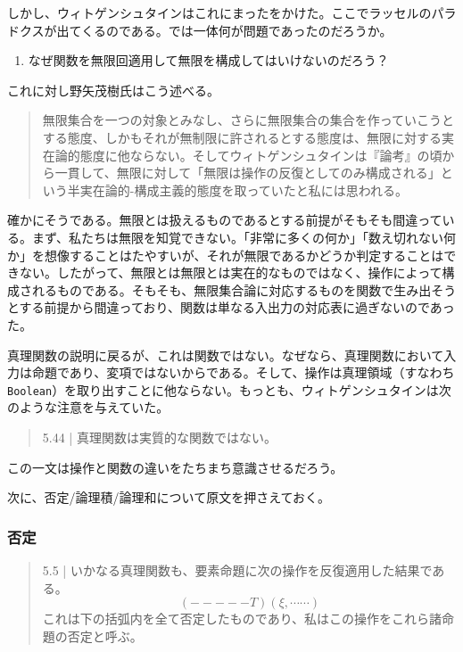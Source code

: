 \documentclass[a4paper,onecolumn,article]{jarticle}
\newcounter{ct}               %
\begin{document}
しかし、ウィトゲンシュタインはこれにまったをかけた。ここでラッセルのパラドクスが出てくるのである。では一体何が問題であったのだろうか。

\begin{enumerate}
  \item なぜ関数を無限回適用して無限を構成してはいけないのだろう？
\end{enumerate}
これに対し野矢茂樹氏はこう述べる。

\begin{quotation}
   無限集合を一つの対象とみなし、さらに無限集合の集合を作っていこうとする態度、しかもそれが無制限に許されるとする態度は、無限に対する実在論的態度に他ならない。そしてウィトゲンシュタインは『論考』の頃から一貫して、無限に対して「無限は操作の反復としてのみ構成される」という半実在論的-構成主義的態度を取っていたと私には思われる。
\end{quotation}

確かにそうである。無限とは扱えるものであるとする前提がそもそも間違っている。まず、私たちは無限を知覚できない。「非常に多くの何か」「数え切れない何か」を想像することはたやすいが、それが無限であるかどうか判定することはできない。したがって、無限とは無限とは実在的なものではなく、操作によって構成されるものである。そもそも、無限集合論に対応するものを関数で生み出そうとする前提から間違っており、関数は単なる入出力の対応表に過ぎないのであった。

真理関数の説明に戻るが、これは関数ではない。なぜなら、真理関数において入力は命題であり、変項ではないからである。そして、操作は真理領域（すなわち\texttt{Boolean}）を取り出すことに他ならない。もっとも、ウィトゲンシュタインは次のような注意を与えていた。

\begin{quote}
  5.44 | 真理関数は実質的な関数ではない。
\end{quote}

この一文は操作と関数の違いをたちまち意識させるだろう。

次に、否定/論理積/論理和について原文を押さえておく。

\subsubsection{否定}

\begin{quote}
  5.5 | いかなる真理関数も、要素命題に次の操作を反復適用した結果である。
  \[ (-----T)(\xi, \cdots \cdots) \]
  これは下の括弧内を全て否定したものであり、私はこの操作をこれら諸命題の否定と呼ぶ。
\end{quote}
\end{document}
